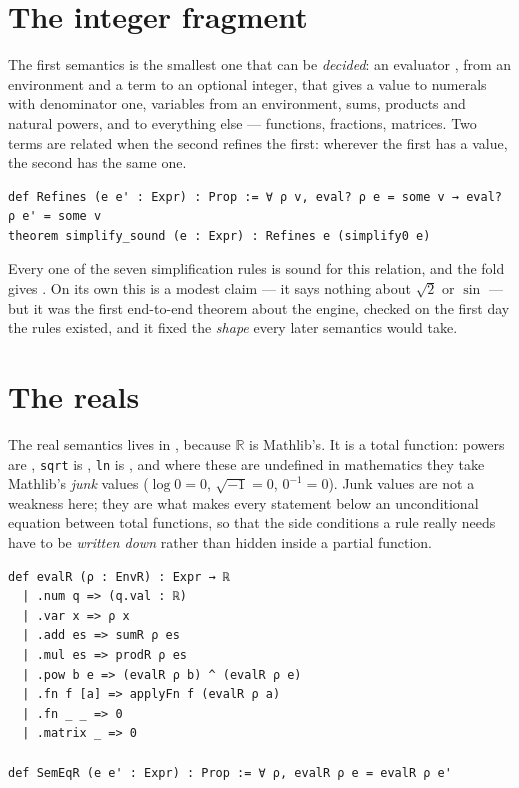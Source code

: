 \section{The integer fragment}

The first semantics is the smallest one that can be \emph{decided}: an evaluator
, from an environment and a term to an optional integer, that gives a value to numerals with denominator one,
variables from an environment, sums, products and natural powers, and  to everything
else --- functions, fractions, matrices. Two terms are related when the second refines the first:
wherever the first has a value, the second has the same one.

\begin{verbatim}
def Refines (e e' : Expr) : Prop := ∀ ρ v, eval? ρ e = some v → eval? ρ e' = some v
theorem simplify_sound (e : Expr) : Refines e (simplify0 e)
\end{verbatim}

Every one of the seven simplification rules is sound for this relation, and the fold gives
. On its own this is a modest claim --- it says nothing about $\sqrt 2$ or
$\sin$ --- but it was the first end-to-end theorem about the engine, checked on the first day the
rules existed, and it fixed the \emph{shape} every later semantics would take.

\section{The reals}

The real semantics lives in , because $\mathbb{R}$ is Mathlib's. It is a total
function: powers are , \texttt{sqrt} is , \texttt{ln} is
, and where these are undefined in mathematics they take Mathlib's \emph{junk} values
($\log 0 = 0$, $\sqrt{-1} = 0$, $0^{-1} = 0$). Junk values are not a weakness here; they are what
makes every statement below an unconditional equation between total functions, so that the side
conditions a rule really needs have to be \emph{written down} rather than hidden inside a partial
function.

\begin{verbatim}
def evalR (ρ : EnvR) : Expr → ℝ
  | .num q => (q.val : ℝ)
  | .var x => ρ x
  | .add es => sumR ρ es
  | .mul es => prodR ρ es
  | .pow b e => (evalR ρ b) ^ (evalR ρ e)
  | .fn f [a] => applyFn f (evalR ρ a)
  | .fn _ _ => 0
  | .matrix _ => 0

def SemEqR (e e' : Expr) : Prop := ∀ ρ, evalR ρ e = evalR ρ e'
\end{verbatim}

